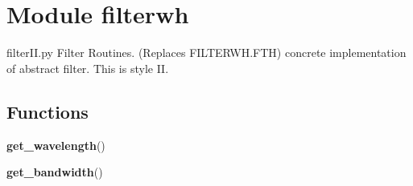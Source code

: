 %
%
%


\section{Module filterwh}

    \label{filterwh}
filterII.py        Filter Routines. (Replaces FILTERWH.FTH) concrete 
implementation of abstract filter. This is style II.



  \subsection{Functions}

    \label{filterwh:get_wavelength}

    \vspace{0.5ex}

    \begin{boxedminipage}{\textwidth}

    \raggedright \textbf{get\_wavelength}()

    \end{boxedminipage}

    \label{filterwh:get_bandwidth}

    \vspace{0.5ex}

    \begin{boxedminipage}{\textwidth}

    \raggedright \textbf{get\_bandwidth}()

    \end{boxedminipage}

    \label{filterwh:get_filtername}

